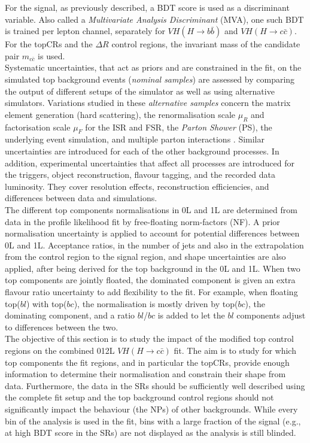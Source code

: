 For the signal, as previously described, a BDT score is used as a discriminant variable. Also called a \textit{Multivariate Analysis Discriminant} (MVA), one such BDT is trained per lepton channel, separately for $VH(H\rightarrow b\bar{b})$ and $VH(H\rightarrow c\bar{c})$. For the topCRs and the $\Delta R$ control regions, the invariant mass of the candidate pair  $m_{c\bar{c}}$ is used. \\

Systematic uncertainties, that act as priors and are constrained in the fit, on the simulated top background events (\textit{nominal samples}) are assessed by comparing the output of different setups of the simulator as well as using alternative simulators. Variations studied in these \textit{alternative samples} concern the matrix element generation (hard scattering), the renormalisation scale $\mu_R$ and factorisation scale $\mu_F$ for the ISR and FSR, the \textit{Parton Shower} (PS), the underlying event simulation, and multiple parton interactions \cite{Mironova:2837159}. Similar uncertainties are introduced for each of the other background processes. In addition, experimental uncertainties that affect all processes are introduced for the triggers, object reconstruction, flavour tagging, and the recorded data luminosity. They cover resolution effects, reconstruction efficiencies, and differences between data and simulations.\\

The different top components normalisations in 0L and 1L are determined from data in the profile likelihood fit by free-floating norm-factors (NF). A prior normalisation uncertainty is applied to account for potential differences between 0L and 1L. Acceptance ratios, in the number of jets and also in the extrapolation from the control region to the signal region, and shape uncertainties are also applied, after being derived for the top background in the 0L and 1L. When two top components are jointly floated, the dominated component is given an extra flavour ratio uncertainty to add flexibility to the fit. For example, when floating top($bl$) with top($bc$), the normalisation is mostly driven by top($bc$), the dominating component, and a ratio $bl$/$bc$ is added to let the $bl$ components adjust to differences between the two.  \\

The objective of this section is to study the impact of the modified top control regions on the combined 012L $VH(H\rightarrow c\bar{c})$ fit. The aim is to study for which top components the fit regions, and in particular the topCRs, provide enough information to determine their normalisation and constrain their shape from data. Furthermore, the data in the SRs should be sufficiently well described using the complete fit setup and the top background control regions should not significantly impact the behaviour (the NPs) of other backgrounds. While every bin of the analysis is used in the fit, bins with a large fraction of the signal (e.g., at high BDT score in the SRs) are not displayed as the analysis is still blinded. \\

